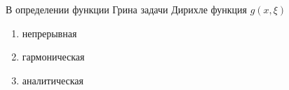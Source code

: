 В определении функции Грина задачи Дирихле функция \(g(x,\xi )\)

\begin{enumerate}[label=\arabic*)]
    \item непрерывная
    \item гармоническая
    \item аналитическая
\end{enumerate}

